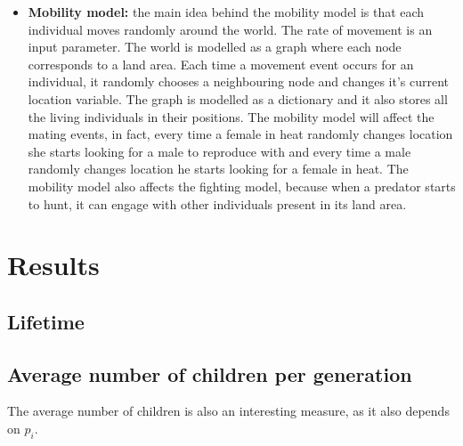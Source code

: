 \documentclass[conference]{IEEEtran}
\begin{document}
\begin{itemize}
        \item \textbf{Mobility model:} the main idea behind the mobility model is that each individual moves randomly around the world. The rate of movement is an input parameter. The world is modelled as a graph where each node corresponds to a land area. Each time a movement event occurs for an individual, it randomly chooses a neighbouring node and changes it's current location variable. The graph is modelled as a dictionary and it also stores all the living individuals in their positions. The mobility model will affect the mating events, in fact, every time a female in heat randomly changes location she starts looking for a male to reproduce with and every time a male randomly changes location he starts looking for a female in heat. The mobility model also affects the fighting model, because when a predator starts to hunt, it can engage with other individuals present in its land area. 
    \end{itemize}

\section{Results}

    \subsection{Lifetime}



    \subsection{Average number of children per generation}
        The average number of children is also an interesting measure, as it also depends on $p_i$.
\end{document}
